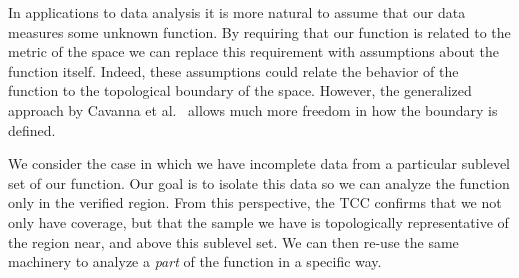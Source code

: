 In applications to data analysis it is more natural to assume that our data measures some unknown function.
By requiring that our function is related to the metric of the space we can replace this requirement with assumptions about the function itself.
Indeed, these assumptions could relate the behavior of the function to the topological boundary of the space.
However, the generalized approach by Cavanna et al.~\cite{cavanna2017when} allows much more freedom in how the boundary is defined.


We consider the case in which we have incomplete data from a particular sublevel set of our function.
Our goal is to isolate this data so we can analyze the function only in the verified region.
From this perspective, the TCC confirms that we not only have coverage, but that the sample we have is topologically representative of the region near, and above this sublevel set.
We can then re-use the same machinery to analyze a \emph{part} of the function in a specific way.

%

